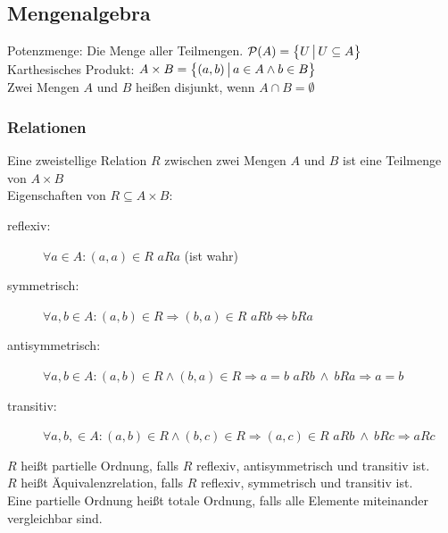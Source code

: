 \documentclass[fs, footer]{latex4ei}
\begin{document}
\vspace{-4mm}
\begin{multicols*}{4}

\subsection{Mengenalgebra}
Potenzmenge: Die Menge aller Teilmengen. $\mathcal P(A) = \bigl\{ \bigl. U \, \bigr| \, U \subseteq A \bigr\}$\\
Karthesisches Produkt: $A \times B = \bigl\{ \bigl. (a,b) \, \bigr| \, a \in A \land b \in B \bigr\}$\\
Zwei Mengen $A$ und $B$ heißen disjunkt, wenn $A \cap B = \emptyset$\\

\subsubsection{Relationen}
Eine zweistellige Relation $R$ zwischen zwei Mengen $A$ und $B$ ist eine Teilmenge von $A \times B$\\
Eigenschaften von $R \subseteq A \times B$:
\begin{description}
	\item[reflexiv:] $\forall a \in A: (a,a)\in R$	\qquad $aRa$ (ist wahr) 
	\item[symmetrisch:] $\forall a,b \in A:(a,b) \in R \Rightarrow (b,a) \in R$ \qquad $aRb \Leftrightarrow bRa$
	\item[antisymmetrisch:] $\forall a,b \in A:(a,b) \in R \land (b,a) \in R \Rightarrow a=b$ \qquad $aRb \ \land \ bRa \Rightarrow a=b$
	\item[transitiv:] $\forall a,b, \in A:(a,b) \in R\land (b,c) \in R \Rightarrow (a,c) \in R$ \qquad $aRb \ \land \ bRc \Rightarrow aRc$
\end{description}

$R$ heißt partielle Ordnung, falls $R$ reflexiv, antisymmetrisch und transitiv ist.\\
$R$ heißt Äquivalenzrelation, falls $R$ reflexiv, symmetrisch und transitiv ist.\\
Eine partielle Ordnung heißt totale Ordnung, falls alle Elemente miteinander vergleichbar sind.\\


\end{multicols*}
\end{document}
